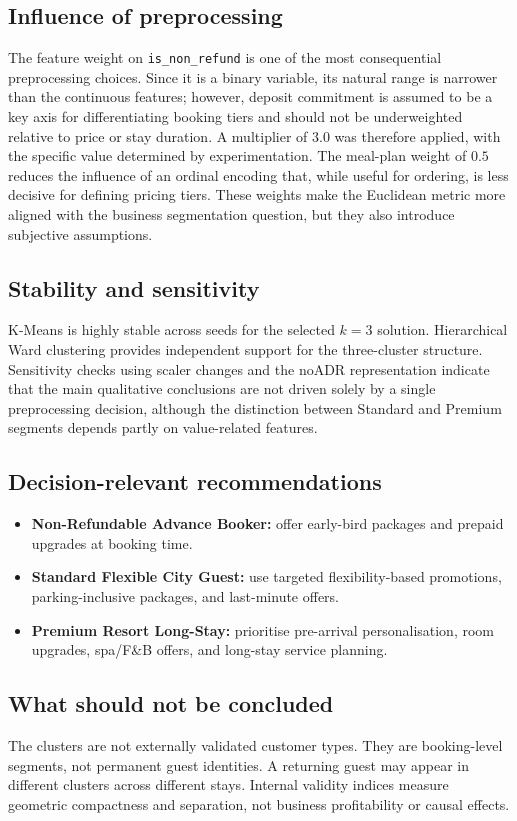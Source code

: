 \documentclass[11pt,a4paper]{article}
\begin{document}
\subsection{Influence of preprocessing}
The feature weight on \texttt{is\_non\_refund} is one of the most consequential preprocessing choices. Since it is a binary variable, its natural range is narrower than the continuous features; however, deposit commitment is assumed to be a key axis for differentiating booking tiers and should not be underweighted relative to price or stay duration. A multiplier of $3.0$ was therefore applied, with the specific value determined by experimentation. The meal-plan weight of $0.5$ reduces the influence of an ordinal encoding that, while useful for ordering, is less decisive for defining pricing tiers. These weights make the Euclidean metric more aligned with the business segmentation question, but they also introduce subjective assumptions.

\subsection{Stability and sensitivity}
K-Means is highly stable across seeds for the selected $k=3$ solution. Hierarchical Ward clustering provides independent support for the three-cluster structure. Sensitivity checks using scaler changes and the noADR representation indicate that the main qualitative conclusions are not driven solely by a single preprocessing decision, although the distinction between Standard and Premium segments depends partly on value-related features.

\subsection{Decision-relevant recommendations}
\begin{itemize}
    \item \textbf{Non-Refundable Advance Booker:} offer early-bird packages and prepaid upgrades at booking time.
    \item \textbf{Standard Flexible City Guest:} use targeted flexibility-based promotions, parking-inclusive packages, and last-minute offers.
    \item \textbf{Premium Resort Long-Stay:} prioritise pre-arrival personalisation, room upgrades, spa/F\&B offers, and long-stay service planning.
\end{itemize}

\subsection{What should not be concluded}
The clusters are not externally validated customer types. They are booking-level segments, not permanent guest identities. A returning guest may appear in different clusters across different stays. Internal validity indices measure geometric compactness and separation, not business profitability or causal effects.
\end{document}
